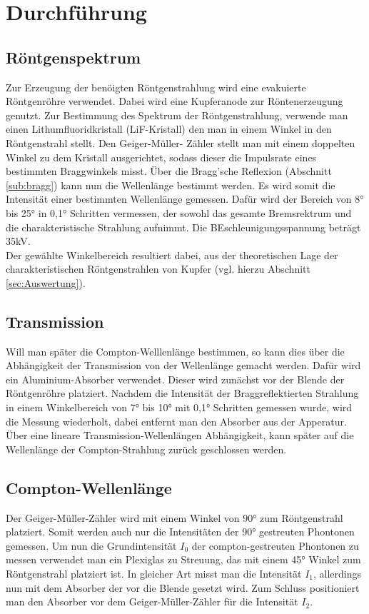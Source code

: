 \newpage
\section{Durchführung}
\subsection{Röntgenspektrum}
Zur Erzeugung der benöigten Röntgenstrahlung wird eine evakuierte Röntgenröhre verwendet.
Dabei wird eine Kupferanode zur Röntenerzeugung genutzt.
Zur Bestimmung des Spektrum der Röntgenstrahlung, verwende man einen Lithumfluoridkristall 
(LiF-Kristall) den man in einem Winkel in den Röntgenstrahl stellt. Den Geiger-Müller-
Zähler stellt man mit einem doppelten Winkel zu dem Kristall ausgerichtet, sodass dieser
die Impulsrate eines bestimmten Braggwinkels misst. Über die Bragg'sche Reflexion (Abschnitt \ref{sub:bragg})
kann nun die Wellenlänge bestimmt werden. Es wird somit die Intensität einer bestimmten Wellenlänge gemessen.
Dafür wird der Bereich von 8° bis 25° in 0,1° Schritten vermessen, der sowohl das
gesamte Bremsrektrum und die charakteristische Strahlung aufnimmt. Die BEschleunigungsspannung
beträgt $35$kV.\\
Der gewählte Winkelbereich resultiert dabei, aus der theoretischen Lage 
der charakteristischen Röntgenstrahlen von Kupfer (vgl. hierzu Abschnitt \ref{sec:Auswertung}).
\subsection{Transmission}
Will man später die Compton-Welllenlänge bestimmen, so kann dies über die 
Abhängigkeit der Transmission von der Wellenlänge gemacht werden. Dafür wird
ein Aluminium-Absorber verwendet. Dieser wird zunächst vor der Blende der Röntgenröhre 
platziert. Nachdem die Intensität der Braggreflektierten Strahlung in einem Winkelbereich
von 7° bis 10° mit 0,1° Schritten gemessen wurde, wird die Messung wiederholt, dabei 
entfernt man den Absorber aus der Apperatur.
Über eine lineare Transmission-Wellenlängen Abhängigkeit, kann später auf die Wellenlänge
der Compton-Strahlung zurück geschlossen werden.

\subsection{Compton-Wellenlänge}
Der Geiger-Müller-Zähler wird mit einem Winkel von 90° zum 
Röntgenstrahl platziert. Somit werden auch nur die Intensitäten der 90° 
gestreuten Phontonen gemessen.
Um nun die Grundintensität $I_0$ der compton-gestreuten Phontonen zu messen
verwendet man ein Plexiglas zu Streuung, das mit einem 45° Winkel zum Röntgenstrahl
platziert ist. In gleicher Art misst man die Intensität $I_1$, 
allerdings nun mit dem Absorber der vor die Blende gesetzt wird.
Zum Schluss positioniert man den Absorber vor dem Geiger-Müller-Zähler für
die Intensität $I_2$.

